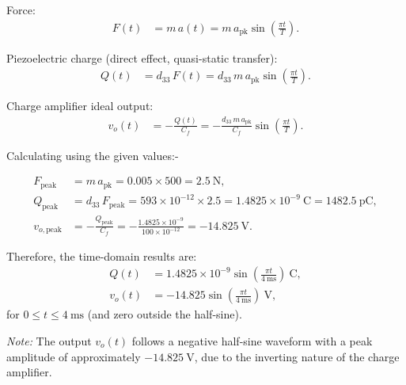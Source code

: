 \begin{solutionblock}
\noindent
Force:
\begin{align*}
    F(t) &= m\,a(t) = m\,a_{\text{pk}}\sin\!\left(\frac{\pi t}{T}\right).
\end{align*}

\noindent
Piezoelectric charge (direct effect, quasi-static transfer):
\begin{align*}
    Q(t) &= d_{33}\,F(t) = d_{33}\,m\,a_{\text{pk}}\sin\!\left(\frac{\pi t}{T}\right).
\end{align*}

\noindent
Charge amplifier ideal output:
\begin{align*}
    v_o(t) &= -\frac{Q(t)}{C_f}
            = -\frac{d_{33}\,m\,a_{\text{pk}}}{C_f}\sin\!\left(\frac{\pi t}{T}\right).
\end{align*}

\noindent
Calculating using the given values:-

\begin{align*}
    F_{\text{peak}} &= m\,a_{\text{pk}} = 0.005 \times 500 = 2.5~\mathrm{N},\\[6pt]
    Q_{\text{peak}} &= d_{33}\,F_{\text{peak}}
                    = 593\times10^{-12} \times 2.5
                    = 1.4825\times10^{-9}~\mathrm{C}
                    = 1482.5~\mathrm{pC},\\[6pt]
    v_{o,\text{peak}} &= -\frac{Q_{\text{peak}}}{C_f}
                      = -\frac{1.4825\times10^{-9}}{100\times10^{-12}}
                      = -14.825~\mathrm{V}.
\end{align*}

\noindent
Therefore, the time-domain results are:
\begin{align*}
    Q(t) &= 1.4825\times10^{-9}\sin\!\left(\frac{\pi t}{4~\text{ms}}\right)\ \text{C},\\[4pt]
    v_o(t) &= -14.825\sin\!\left(\frac{\pi t}{4~\text{ms}}\right)\ \text{V},
\end{align*}
for \( 0 \le t \le 4~\text{ms} \) (and zero outside the half-sine).

\bigskip
\noindent
\textit{Note:} The output \( v_o(t) \) follows a negative half-sine waveform with a peak amplitude of approximately \(-14.825~\text{V}\), due to the inverting nature of the charge amplifier.

\end{solutionblock}






